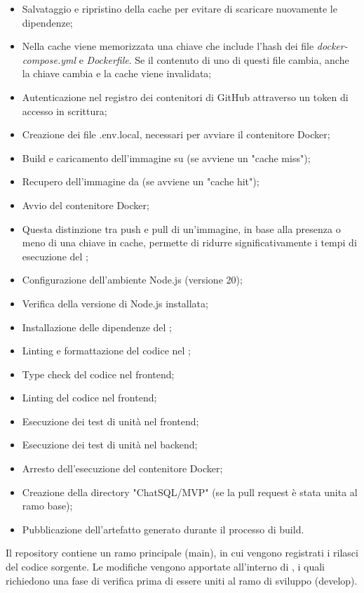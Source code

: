 \begin{itemize}
\begin{itemize}
    \item Salvataggio e ripristino della cache per evitare di scaricare nuovamente le dipendenze;
    \item Nella cache viene memorizzata una chiave che include l'hash dei file \emph{docker-compose.yml} e \emph{Dockerfile}. Se il contenuto di uno di questi file cambia, anche la chiave cambia e la cache viene invalidata;
    \item Autenticazione nel registro dei contenitori di GitHub attraverso un token di accesso in scrittura;
    \item Creazione dei file .env.local, necessari per avviare il contenitore Docker;
    \item Build e caricamento dell'immagine su  (se avviene un "cache miss");
    \item Recupero dell'immagine da  (se avviene un "cache hit");
    \item Avvio del contenitore Docker;
    \item Questa distinzione tra push e pull di un'immagine, in base alla presenza o meno di una chiave in cache, permette di ridurre significativamente i tempi di esecuzione del ;
    \item Configurazione dell'ambiente Node.js (versione 20);
    \item Verifica della versione di Node.js installata;
    \item Installazione delle dipendenze del ;
    \item Linting e formattazione del codice nel ;
    \item Type check del codice nel frontend;
    \item Linting del codice nel frontend;
    \item Esecuzione dei test di unità nel frontend;
    \item Esecuzione dei test di unità nel backend;
    \item Arresto dell'esecuzione del contenitore Docker;
    \item Creazione della directory "ChatSQL/MVP" (se la pull request è stata unita al ramo base);
    \item Pubblicazione dell'artefatto generato durante il processo di build.
  \end{itemize}
\end{itemize}

\vspace{0.5\baselineskip}
\par Il repository contiene un ramo principale (main), in cui vengono registrati i rilasci del codice sorgente. Le modifiche vengono apportate all'interno di , i quali richiedono una fase di verifica prima di essere uniti al ramo di sviluppo (develop).

